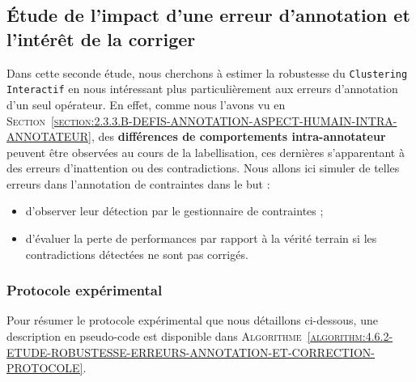 	\subsection{Étude de l'impact d'une erreur d'annotation et l'intérêt de la corriger}
	\label{section:4.6.2-ETUDE-ROBUSTESSE-ERREURS-ANNOTATION-ET-CORRECTION}
		
		Dans cette seconde étude, nous cherchons à estimer la robustesse du \texttt{Clustering Interactif} en nous intéressant plus particulièrement aux erreurs d'annotation d'un seul opérateur.
		En effet, comme nous l'avons vu en \textsc{Section~\ref{section:2.3.3.B-DEFIS-ANNOTATION-ASPECT-HUMAIN-INTRA-ANNOTATEUR}}, des \textbf{différences de comportements intra-annotateur} peuvent être observées au cours de la labellisation, ces dernières s'apparentant à des erreurs d'inattention ou des contradictions.
		Nous allons ici simuler de telles erreurs dans l'annotation de contraintes dans le but :
		\begin{itemize}
			\item d'observer leur détection par le gestionnaire de contraintes ;
			\item d'évaluer la perte de performances par rapport à la vérité terrain si les contradictions détectées ne sont pas corrigés.
		\end{itemize}
	
		\subsubsection{Protocole expérimental}
			
			Pour résumer le protocole expérimental que nous détaillons ci-dessous, une description en pseudo-code est disponible dans \textsc{Algorithme~\ref{algorithm:4.6.2-ETUDE-ROBUSTESSE-ERREURS-ANNOTATION-ET-CORRECTION-PROTOCOLE}}.
			
